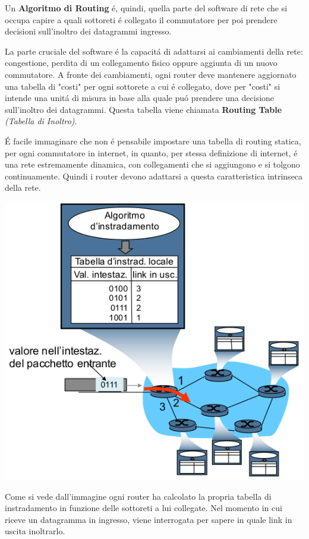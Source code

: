 \documentclass[12pt]{article}
\begin{document}
Un \textbf{Algoritmo di Routing} \'e, quindi, quella parte del software di rete che si occupa capire a quali sottoreti \'e 
collegato il commutatore per poi prendere decisioni sull'inoltro dei datagrammi ingresso.

La parte cruciale del software \'e la capacit\'a di adattarsi ai cambiamenti della rete: congestione, perdita di un 
collegamento fisico oppure aggiunta di un nuovo commutatore. A fronte dei cambiamenti, ogni router deve mantenere 
aggiornato una tabella di "costi" per ogni sottorete a cui \'e collegato, dove per "costi" si intende una unit\'a di 
misura in base alla quale pu\'o prendere una decisione sull'inoltro dei datagrammi. Questa tabella viene chiamata 
\textbf{Routing Table} \textit{(Tabella di Inoltro)}.

\'E facile immaginare che non \'e pensabile impostare una tabella di routing statica, per ogni commutatore in internet, in 
quanto, per stessa definizione di internet, \'e una rete estremamente dinamica, con collegamenti che si aggiungono e si 
tolgono continuamente. Quindi i router devono adattarsi a questa caratteristica intrinseca della rete.
\begin{center}
	\includegraphics[scale=0.5]{livello_di_rete-img7.png}
\end{center}
Come si vede dall'immagine ogni router ha calcolato la propria tabella di instradamento in funzione delle sottoreti a lui 
collegate. Nel momento in cui riceve un datagramma in ingresso, viene interrogata per sapere in quale link in uscita 
inoltrarlo.
\end{document}
